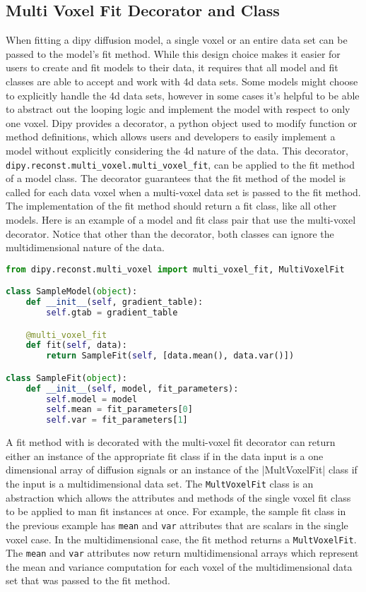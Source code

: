 \subsection{Multi Voxel Fit Decorator and Class}

When fitting a dipy diffusion model, a single voxel or an entire data set can be passed to the model's fit method. While this design choice makes it easier for users to create and fit models to their data, it requires that all model and fit classes are able to accept and work with 4d data sets. Some models might choose to explicitly handle the 4d data sets, however in some cases it's helpful to be able to abstract out the looping logic and implement the model with respect to only one voxel. Dipy provides a decorator, a python object used to modify function or method definitions, which allows users and developers to easily implement a model without explicitly considering the 4d nature of the data. This decorator, \verb|dipy.reconst.multi_voxel.multi_voxel_fit|, can be applied to the fit method of a model class. The decorator guarantees that the fit method of the model is called for each data voxel when a multi-voxel data set is passed to the fit method. The implementation of the fit method should return a fit class, like all other models. Here is an example of a model and fit class pair that use the multi-voxel decorator. Notice that other than the decorator, both classes can ignore the multidimensional nature of the data.

\begin{lstlisting}[language=python]
from dipy.reconst.multi_voxel import multi_voxel_fit, MultiVoxelFit

class SampleModel(object):
    def __init__(self, gradient_table):
        self.gtab = gradient_table

    @multi_voxel_fit
    def fit(self, data):
        return SampleFit(self, [data.mean(), data.var()])

class SampleFit(object):
    def __init__(self, model, fit_parameters):
        self.model = model
        self.mean = fit_parameters[0]
        self.var = fit_parameters[1]
\end{lstlisting}

A fit method with is decorated with the multi-voxel fit decorator can return either an instance of the appropriate fit class if in the data input is a one dimensional array of diffusion signals or an instance of the \varb|MultVoxelFit| class if the input is a multidimensional data set. The \verb|MultVoxelFit| class is an abstraction which allows the attributes and methods of the single voxel fit class to be applied to man fit instances at once. For example, the sample fit class in the previous example has \verb|mean| and \verb|var| attributes that are scalars in the single voxel case. In the multidimensional case, the fit method returns a \verb|MultVoxelFit|. The \verb|mean| and \verb|var| attributes now return multidimensional arrays which represent the mean and variance computation for each voxel of the multidimensional data set that was passed to the fit method.

